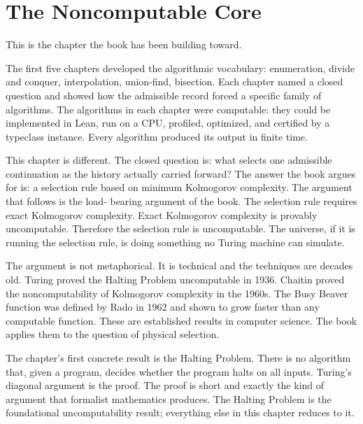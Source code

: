 \chapter{The Noncomputable Core}
\label{chap:noncomputable-core}


\begin{chapteressay}

This is the chapter the book has been building toward.

The first five chapters developed the algorithmic vocabulary:
enumeration, divide and conquer, interpolation, union-find,
bisection. Each chapter named a closed question and showed how the
admissible record forced a specific family of algorithms. The
algorithms in each chapter were computable: they could be
implemented in Lean, run on a CPU, profiled, optimized, and
certified by a typeclass instance. Every algorithm produced its
output in finite time.

This chapter is different. The closed question is: what selects one
admissible continuation as the history actually carried forward? The
answer the book argues for is: a selection rule based on minimum
Kolmogorov complexity. The argument that follows is the load-
bearing argument of the book. The selection rule requires exact
Kolmogorov complexity. Exact Kolmogorov complexity is provably
uncomputable. Therefore the selection rule is uncomputable. The
universe, if it is running the selection rule, is doing something
no Turing machine can simulate.

The argument is not metaphorical. It is technical and the
techniques are decades old. Turing proved the Halting Problem
uncomputable in 1936. Chaitin proved the noncomputability of
Kolmogorov complexity in the 1960s. The Busy Beaver function was
defined by Rado in 1962 and shown to grow faster than any computable
function. These are established results in computer science. The
book applies them to the question of physical selection.

The chapter's first concrete result is the Halting Problem. There
is no algorithm that, given a program, decides whether the
program halts on all inputs. Turing's diagonal argument is the
proof. The proof is short and exactly the kind of argument that
formalist mathematics produces. The Halting Problem is the
foundational uncomputability result; everything else in this
chapter reduces to it.


\end{chapteressay}
